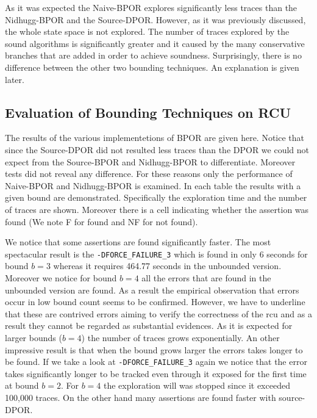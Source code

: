 
As it was expected the Naive-BPOR explores significantly less traces than the Nidhugg-BPOR and the Source-DPOR. However,
as it was previously discussed, the whole state space is not explored. The number of traces explored by the sound
algorithms is significantly greater and it caused by the many conservative branches that are added in order to achieve
soundness. Surprisingly, there is no difference between the other two bounding techniques. An explanation is given
later.

\subsection{Evaluation of Bounding Techniques on RCU}
The results of the various implementetions of BPOR are given here. Notice that since the Source-DPOR did not resulted
less traces than the DPOR we could not expect from the Source-BPOR and Nidhugg-BPOR to differentiate. Moreover tests did not
reveal any difference. For these reasons only the performance of Naive-BPOR and Nidhugg-BPOR is examined. In each table the
results with a given bound are demonstrated. Specifically the exploration time and the number of traces are shown.
Moreover there is a cell indicating whether the assertion was found (We note F for found and NF for not found).




We notice that some assertions are found significantly faster. The most spectacular result is the
\verb|-DFORCE_FAILURE_3| which is found in only 6 seconds for bound $b=3$ whereas it requires 464.77 seconds in the
unbounded version. Moreover we notice for bound $b=4$ all the errors that are found in the unbounded version are found. As
a result the empirical observation that errors occur in low bound count seems to be confirmed. However, we have to
underline that these are contrived errors aiming to verify the correctness of the rcu and as a result they cannot be
regarded as substantial evidences. As it is expected for larger bounds ($b=4$) the number of traces grows exponentially.
An other impressive result is that when the bound grows larger the errors takes longer to be found. If we take a look at
\verb|-DFORCE_FAILURE_3| again we notice that the error takes significantly longer to be tracked even through it exposed
for the first time at bound $b=2$. For $b=4$ the exploration will was stopped since it exceeded 100,000 traces. On the other
hand many assertions are found faster with source-DPOR.

